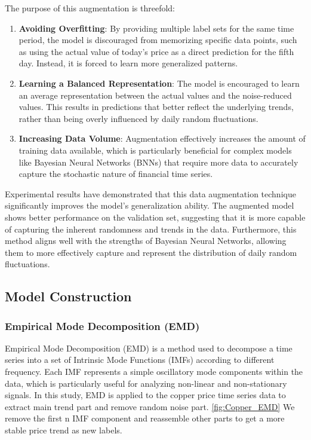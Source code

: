 \documentclass[final-report]{report-template}
\begin{document}
The purpose of this augmentation is threefold:
\begin{enumerate}
    \item \textbf{Avoiding Overfitting}: By providing multiple label sets for the same time period, the model is discouraged from memorizing specific data points, such as using the actual value of today's price as a direct prediction for the fifth day. Instead, it is forced to learn more generalized patterns.
    \item \textbf{Learning a Balanced Representation}: The model is encouraged to learn an average representation between the actual values and the noise-reduced values. This results in predictions that better reflect the underlying trends, rather than being overly influenced by daily random fluctuations.
    \item \textbf{Increasing Data Volume}: Augmentation effectively increases the amount of training data available, which is particularly beneficial for complex models like Bayesian Neural Networks (BNNs) that require more data to accurately capture the stochastic nature of financial time series.
\end{enumerate}

Experimental results have demonstrated that this data augmentation technique significantly improves the model's generalization ability. The augmented model shows better performance on the validation set, suggesting that it is more capable of capturing the inherent randomness and trends in the data. Furthermore, this method aligns well with the strengths of Bayesian Neural Networks, allowing them to more effectively capture and represent the distribution of daily random fluctuations.

\subsection{Model Construction}

\subsubsection{\textbf{Empirical Mode Decomposition (EMD)}}
Empirical Mode Decomposition (EMD) is a method used to decompose a time series into a set of Intrinsic Mode Functions (IMFs) according to different frequency.  Each IMF represents a simple oscillatory mode components within the data, which is particularly useful for analyzing non-linear and non-stationary signals. In this study, EMD is applied to the copper price time series data to extract main trend part and remove random noise part. \autoref{fig:Copper_EMD} We remove the first n IMF component and reassemble other parts to get a more stable price trend as new labels.
\end{document}
